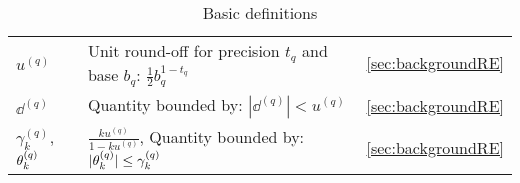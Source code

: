 \begin{table}[H]
\begin{tabular}{|m{1.7cm}|m{10.3cm}|c|}
		$u^{(q)}$ & Unit round-off for precision $t_q$ and base $b_q$: $\frac{1}{2}b_q^{1-t_q}$ & \ref{sec:backgroundRE} \\ 
		$\dd^{(q)}$ &Quantity bounded by: $|\dd^{(q)}| < u^{(q)}$ &  \ref{sec:backgroundRE} \\
		$\gamma^{(q)}_{k}$,  $\theta^{(q)}_{k}$& $\frac{ku^{(q)}}{1-ku^{(q)}}$, Quantity bounded by: $|\theta^{(q)}_{k}|\leq\gamma^{(q)}_{k}$ &  \ref{sec:backgroundRE} \\
		\hline
		\hline		
		\hline
	\end{tabular}
	\caption{Basic definitions}
	\label{table:notation}
\end{table}